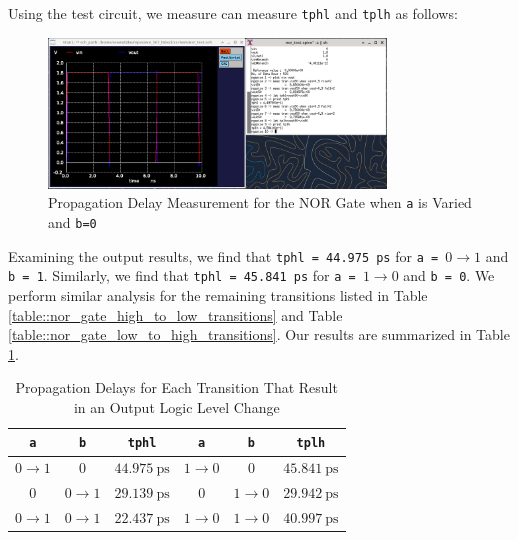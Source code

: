 \documentclass{article}
\begin{document}
	\noindent Using the test circuit, we measure can measure \texttt{tphl} and \texttt{tplh} as follows:
	
	\begin{figure}[H]
		\centerline{\includegraphics[width=0.8\textwidth]{nor_delay_sweep_va.png}}
		\caption{Propagation Delay Measurement for the NOR Gate when \texttt{a} is Varied and \texttt{b=0}}
		\label{fig::nor_delay_sweep_va}
	\end{figure}
	
	Examining the output results, we find that \texttt{tphl = 44.975 ps} for \texttt{a = }$0 \rightarrow 1$ and \texttt{b = 1}. Similarly, we find that \texttt{tphl = 45.841 ps} for \texttt{a = }$1 \rightarrow 0$ and \texttt{b = 0}. We perform similar analysis for the remaining transitions listed in Table \ref{table::nor_gate_high_to_low_transitions} and Table \ref{table::nor_gate_low_to_high_transitions}. Our results are summarized in Table \ref{table::nor_gate_delay_analysis}.
	
	\begin{table}[H]
	\begin{center}
	\caption{Propagation Delays for Each Transition That Result in an Output Logic Level Change}
	\label{table::nor_gate_delay_analysis}
	\begin{tabular}{| c | c | c || c | c | c |}
		\hline
		\texttt{a} & \texttt{b} & \texttt{tphl} & \texttt{a} & \texttt{b} & \texttt{tplh} \\
		\hline	
		$0 \rightarrow 1$ & $0$ & $44.975\ \text{ps}$ & $1 \rightarrow 0$ & $0$ & $45.841\ \text{ps}$\\
		\hline	
		$0$ & $0 \rightarrow 1$ & $29.139\ \text{ps}$ & $0$ & $1 \rightarrow 0$ & $29.942\ \text{ps}$\\
		\hline	
		$0 \rightarrow 1$ & $0 \rightarrow 1$ & $22.437\ \text{ps}$ & $1 \rightarrow 0$ & $1 \rightarrow 0$ & $40.997\ \text{ps}$\\
		\hline
	\end{tabular}
	\end{center}
	\end{table}
	
\end{document}
